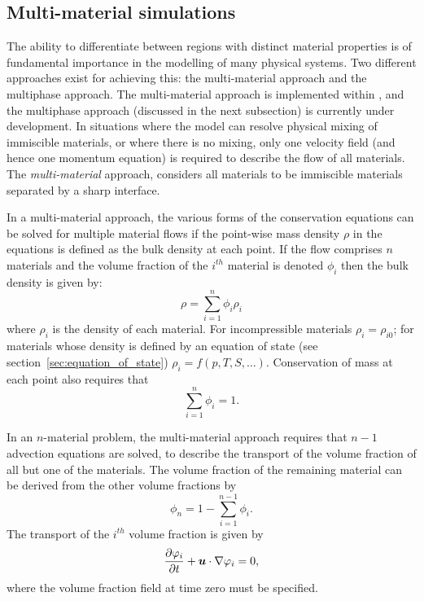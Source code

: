 \subsection{Multi-material simulations}
The ability to differentiate between regions with distinct material properties is of fundamental importance in the modelling of many physical systems. Two different approaches exist for achieving this: the multi-material approach and the multiphase approach. The multi-material approach is implemented within \fluidity, and the multiphase approach (discussed in the next subsection) is currently under development.
In situations where the model can resolve physical mixing of immiscible materials, or where there is no mixing, only one velocity field (and hence one momentum equation) is required to describe the flow of all materials. The \emph{multi-material} approach, considers all materials to be immiscible materials separated by a sharp interface.

In a multi-material approach, the various forms of the conservation equations can be solved for multiple material flows if the point-wise mass density $\rho$ in the equations is defined as the bulk density at each point.  If the flow comprises $n$ materials and the volume fraction of the $i^{th}$ material is denoted $\phi_i$ then the bulk density is given by:
\begin{equation}
\rho = \sum_{i=1}^n \phi_i\rho_i
\end{equation}
where $\rho_i$ is the density of each material.  For incompressible materials $\rho_i = \rho_{i0}$; for materials whose density is defined by an equation of state (see section~\ref{sec:equation_of_state}) $\rho_i = f(p,T,S,\ldots)$.  Conservation of mass at each point also requires that
\begin{equation}
\sum_{i=1}^n \phi_{i} = 1.
\end{equation}

In an $n$-material problem, the multi-material approach requires that $n-1$ advection equations are solved, to describe the transport of the volume fraction of all but one of the materials.  The volume fraction of the remaining material can be derived from the other volume fractions by
\begin{equation}\label{diagnosticvolfrac}
\phi_{n} = 1 - \sum_{i=1}^{n-1}\phi_{i}.
\end{equation}
The transport of the $i^{th}$ volume fraction is given by
\begin{equation}
\frac{\partial\varphi_i}{\partial t} + {\mbox{\boldmath$u$}}\cdot\nabla\varphi_i = 0,
\end{equation}
where the volume fraction field at time zero must be specified.

